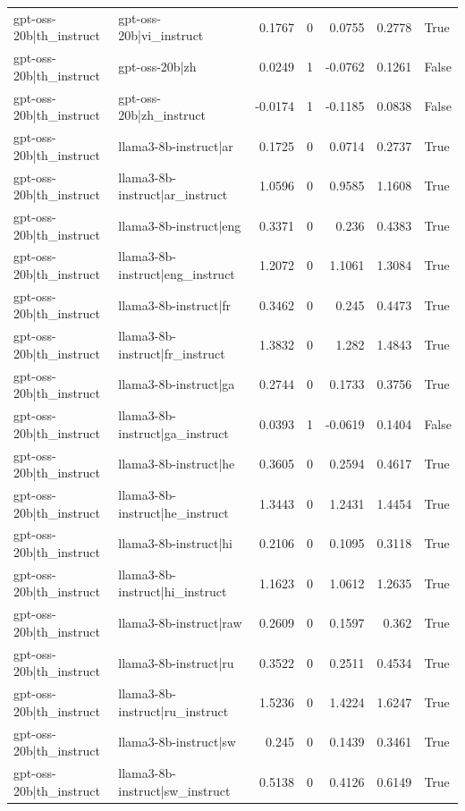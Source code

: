 \begin{table}
\begin{tabular}{l l r r r r l}
gpt-oss-20b|th_instruct & gpt-oss-20b|vi_instruct & 0.1767 & 0 & 0.0755 & 0.2778 & True \\
gpt-oss-20b|th_instruct & gpt-oss-20b|zh & 0.0249 & 1 & -0.0762 & 0.1261 & False \\
gpt-oss-20b|th_instruct & gpt-oss-20b|zh_instruct & -0.0174 & 1 & -0.1185 & 0.0838 & False \\
gpt-oss-20b|th_instruct & llama3-8b-instruct|ar & 0.1725 & 0 & 0.0714 & 0.2737 & True \\
gpt-oss-20b|th_instruct & llama3-8b-instruct|ar_instruct & 1.0596 & 0 & 0.9585 & 1.1608 & True \\
gpt-oss-20b|th_instruct & llama3-8b-instruct|eng & 0.3371 & 0 & 0.236 & 0.4383 & True \\
gpt-oss-20b|th_instruct & llama3-8b-instruct|eng_instruct & 1.2072 & 0 & 1.1061 & 1.3084 & True \\
gpt-oss-20b|th_instruct & llama3-8b-instruct|fr & 0.3462 & 0 & 0.245 & 0.4473 & True \\
gpt-oss-20b|th_instruct & llama3-8b-instruct|fr_instruct & 1.3832 & 0 & 1.282 & 1.4843 & True \\
gpt-oss-20b|th_instruct & llama3-8b-instruct|ga & 0.2744 & 0 & 0.1733 & 0.3756 & True \\
gpt-oss-20b|th_instruct & llama3-8b-instruct|ga_instruct & 0.0393 & 1 & -0.0619 & 0.1404 & False \\
gpt-oss-20b|th_instruct & llama3-8b-instruct|he & 0.3605 & 0 & 0.2594 & 0.4617 & True \\
gpt-oss-20b|th_instruct & llama3-8b-instruct|he_instruct & 1.3443 & 0 & 1.2431 & 1.4454 & True \\
gpt-oss-20b|th_instruct & llama3-8b-instruct|hi & 0.2106 & 0 & 0.1095 & 0.3118 & True \\
gpt-oss-20b|th_instruct & llama3-8b-instruct|hi_instruct & 1.1623 & 0 & 1.0612 & 1.2635 & True \\
gpt-oss-20b|th_instruct & llama3-8b-instruct|raw & 0.2609 & 0 & 0.1597 & 0.362 & True \\
gpt-oss-20b|th_instruct & llama3-8b-instruct|ru & 0.3522 & 0 & 0.2511 & 0.4534 & True \\
gpt-oss-20b|th_instruct & llama3-8b-instruct|ru_instruct & 1.5236 & 0 & 1.4224 & 1.6247 & True \\
gpt-oss-20b|th_instruct & llama3-8b-instruct|sw & 0.245 & 0 & 0.1439 & 0.3461 & True \\
gpt-oss-20b|th_instruct & llama3-8b-instruct|sw_instruct & 0.5138 & 0 & 0.4126 & 0.6149 & True \\

\end{tabular}
\end{table}
